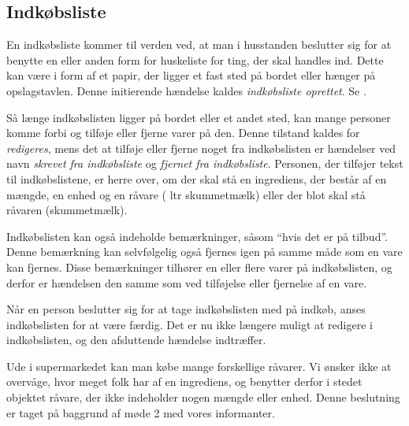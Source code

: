 \subsection{Indkøbsliste}
En indkøbsliste kommer til verden ved, at man i husstanden beslutter sig for at benytte en eller anden form for huskeliste for ting, der skal handles ind. Dette kan være i form af et papir, der ligger et fast sted på bordet eller hænger på opslagstavlen. Denne initierende hændelse kaldes \textit{indkøbsliste oprettet}. Se .

Så længe indkøbslisten ligger på bordet eller et andet sted, kan mange personer komme forbi og tilføje eller fjerne varer på den. Denne tilstand kaldes for \textit{redigeres}, mens det at tilføje eller fjerne noget fra indkøbslisten er hændelser ved navn \textit{skrevet fra indkøbsliste} og \textit{fjernet fra indkøbsliste}. Personen, der tilføjer tekst til indkøbslistene, er herre over, om der skal stå en ingrediens, der består af en mængde, en enhed og en råvare ( ltr skummetmælk) eller der blot skal stå råvaren (\fx skummetmælk).

Indkøbslisten kan også indeholde bemærkninger, såsom ``hvis det er på tilbud''. Denne bemærkning kan selvfølgelig også fjernes igen på samme måde som en vare kan fjernes. Disse bemærkninger tilhører en eller flere varer på indkøbslisten, og derfor er hændelsen den samme som ved tilføjelse eller fjernelse af en vare.

Når en person beslutter sig for at tage indkøbslisten med på indkøb, anses indkøbslisten for at være færdig. Det er nu ikke længere muligt at redigere i indkøbslisten, og den afsluttende hændelse indtræffer. 

Ude i supermarkedet kan man købe mange forskellige råvarer. Vi ønsker ikke at overvåge, hvor meget folk har af en ingrediens, og benytter derfor i stedet objektet råvare, der ikke indeholder nogen mængde eller enhed. Denne beslutning er taget på baggrund af møde 2 med vores informanter.

\begin{figure}[H]
	\centering
	\scalebox{0.8}{
		}
		\label{fig:indkoebsliste-adfaerd}
\end{figure}